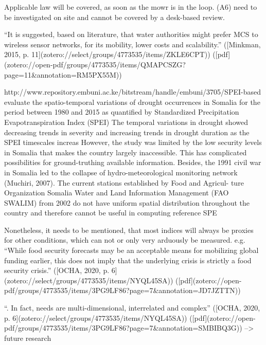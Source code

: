 Applicable law will be covered, as soon as the \acrshort{mowr} is in the loop. (A6) need to be investigated on site and cannot be covered by a desk-based review.


“It is suggested, based on literature, that water authorities might prefer MCS to wireless sensor networks, for its mobility, lower costs and scalability.” ([Minkman, 2015, p. 11](zotero://select/groups/4773535/items/ZKLE6CPT)) ([pdf](zotero://open-pdf/groups/4773535/items/QMAPCSZG?page=11&annotation=RM5PX55M))


http://www.repository.embuni.ac.ke/bitstream/handle/embuni/3705/SPEI-based%
evaluate the spatio-temporal variations of drought occurrences in Somalia for the period between 1980 and 2015 as quantified by Standardized Precipitation Evapotranspiration Index (SPEI)
The temporal variations in drought showed decreasing trends in severity and increasing trends in drought duration as the SPEI timescales increas
However, the study was limited by the low security levels in Somalia that makes
the country largely inaccessible. This has complicated possibilities for
ground-truthing available information. Besides, the 1991 civil war in
Somalia led to the collapse of hydro-meteorological monitoring network
(Muchiri, 2007). The current stations established by Food and Agricul-
ture Organization Somalia Water and Land Information Management
(FAO SWALIM) from 2002 do not have uniform spatial distribution
throughout the country and therefore cannot be useful in computing
reference SPE



Nonetheless, it needs to be mentioned, that most indices will always be proxies for other conditions, which can not or only very arduously be measured. 
e.g. “While food security forecasts may be an acceptable means for mobilizing global funding earlier, this does not imply that the underlying crisis is strictly a food security crisis.” ([OCHA, 2020, p. 6](zotero://select/groups/4773535/items/NYQL45SA)) ([pdf](zotero://open-pdf/groups/4773535/items/3PG9LF86?page=7&annotation=JD7JZTTN))




“. In fact, needs are multi-dimensional, interrelated and complex” ([OCHA, 2020, p. 6](zotero://select/groups/4773535/items/NYQL45SA)) ([pdf](zotero://open-pdf/groups/4773535/items/3PG9LF86?page=7&annotation=SMBIBQ3G))
--> future research

